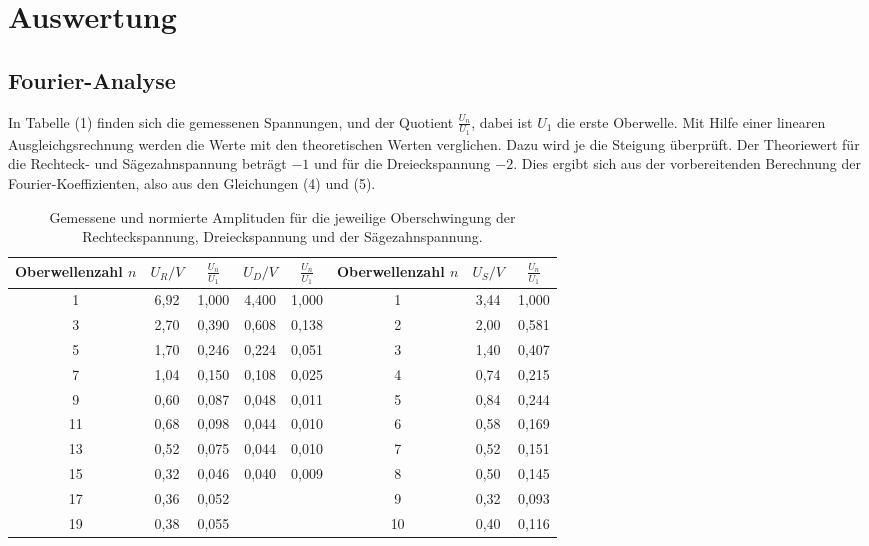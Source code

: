 \section{Auswertung}
\label{sec:Auswertung}

\subsection{Fourier-Analyse}
In Tabelle (1) finden sich die gemessenen Spannungen, und der Quotient $\frac{U_n}{U_1}$, dabei ist $U_1$ die erste Oberwelle. Mit Hilfe einer linearen Ausgleichgsrechnung werden die Werte mit den theoretischen
Werten verglichen. Dazu wird je die Steigung überprüft. Der Theoriewert für die Rechteck- und Sägezahnspannung beträgt $-1$ und für
die Dreieckspannung $-2$. Dies ergibt sich aus der vorbereitenden Berechnung der Fourier-Koeffizienten, also aus den Gleichungen (4) und (5).



\begin{table}[H]
  \centering
  \caption{Gemessene und normierte Amplituden für die jeweilige Oberschwingung der Rechteckspannung, Dreieckspannung und der Sägezahnspannung.}
  \label{tab:Rechteckspannung}
  \begin{tabular}{c  | c c | c c | c  | c c }
    \toprule
   Oberwellenzahl $n$ & $U_R/V$ & $\frac{U_n}{U_1}$ & $U_D/V$ & $\frac{U_n}{U_1}$ &Oberwellenzahl $n$ & $U_S/V$ & $\frac{U_n}{U_1}$ \\
    \midrule
    1 & 6,92 & 1,000  &4,400 &  1,000 &1 & 3,44 & 1,000 \\
    3 & 2,70 & 0,390 &0,608 &  0,138 &2 & 2,00 & 0,581 \\
    5 & 1,70 & 0,246 & 0,224 & 0,051 &3 & 1,40 & 0,407 \\
    7 & 1,04 & 0,150 & 0,108 & 0,025 &4 & 0,74 & 0,215 \\
    9 & 0,60 & 0,087 & 0,048 & 0,011 &5 & 0,84 & 0,244 \\
    11 & 0,68 & 0,098 & 0,044 & 0,010 &6 & 0,58 & 0,169 \\
    13 & 0,52 & 0,075& 0,044 & 0,010 &7 & 0,52 & 0,151 \\
    15 & 0,32 & 0,046 & 0,040 & 0,009 &8 & 0,50 & 0,145 \\
    17 & 0,36 & 0,052& & & 9& 0,32 & 0,093 \\
    19 & 0,38 & 0,055& & &10& 0,40 & 0,116 \\
    \bottomrule
  \end{tabular}
\end{table}

